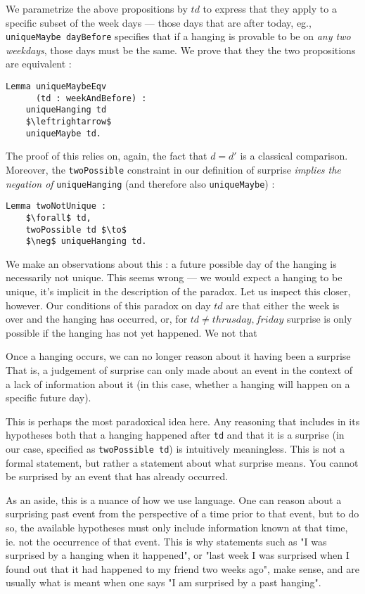 \documentclass[journal]{journal}
\begin{document}
We parametrize the above propositions by $td$ to express that they apply to
a specific subset of the week days --- those days that are after today,
eg., {\tt uniqueMaybe dayBefore} specifies that if a hanging is provable to be
on \emph{any two weekdays}, those days must be the same.
We prove that they the two propositions are equivalent :

\begin{lstlisting}[mathescape=true]
  Lemma uniqueMaybeEqv
      (td : weekAndBefore) :
    uniqueHanging td
    $\leftrightarrow$
    uniqueMaybe td.
\end{lstlisting}

The proof of this relies on, again, the fact that $d = d'$ is a classical
comparison. Moreover, the {\tt twoPossible} constraint
in our definition of surprise \emph{implies the negation of} {\tt uniqueHanging}
(and therefore also {\tt uniqueMaybe}) :

\begin{lstlisting}[mathescape=true]
  Lemma twoNotUnique :
    $\forall$ td,
    twoPossible td $\to$
    $\neg$ uniqueHanging td.
\end{lstlisting}

We make an observations about this : a future possible day of the hanging is
necessarily not unique. This seems wrong --- we would expect a hanging to be
unique, it's implicit in the
description of the paradox. Let us inspect this closer, however.
Our conditions of this paradox on day $td$ are that either
the week is over and the hanging has occurred, or, for $td \neq thrusday, friday$ surprise is
only possible if the hanging has not yet happened. We not that

Once a hanging occurs, we can no longer reason about it having been a surprise
That is, a judgement of surprise can only made about
an event in the context of a lack of information about it (in this case,
whether a hanging will happen on a specific future day).

This is perhaps the most paradoxical idea here. Any reasoning that includes
in its hypotheses both that a hanging happened after {\tt td} and that it is a surprise
(in our case, specified as {\tt twoPossible td}) is intuitively meaningless. This is not a
formal statement, but rather a statement about what surprise means. You cannot
be surprised by an event that has already occurred.

As an aside, this is a nuance of how we use language. One can reason about a surprising past
event from the perspective of a time prior to that event, but to do so,
the available hypotheses must only include information known at that time, ie.
not the occurrence of that event. This is why statements such as "I was surprised
by a hanging when it happened", or "last week I was surprised when I found out
that it had happened to my friend two weeks ago", make sense, and are usually
what is meant when one says "I am surprised by a past hanging".
\end{document}
